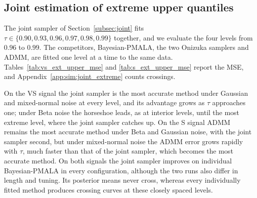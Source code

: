 \subsection{Joint estimation of extreme upper quantiles}
\label{sec:sim:extreme}

The joint sampler of Section~\ref{subsec:joint} fits $\tau\in\{0.90,0.93,0.96,0.97,0.98,0.99\}$ together, and we evaluate the four levels from $0.96$ to $0.99$. The competitors, Bayesian-PMALA, the two Onizuka samplers and ADMM, are fitted one level at a time to the same data. Tables~\ref{tab:vs_ext_upper_mse} and \ref{tab:s_ext_upper_mse} report the MSE, and Appendix~\ref{app:sim:joint_extreme} counts crossings.

On the VS signal the joint sampler is the most accurate method under Gaussian and mixed-normal noise at every level, and its advantage grows as $\tau$ approaches one; under Beta noise the horseshoe leads, as at interior levels, until the most extreme level, where the joint sampler catches up. On the S signal ADMM remains the most accurate method under Beta and Gaussian noise, with the joint sampler second, but under mixed-normal noise the ADMM error grows rapidly with $\tau$, much faster than that of the joint sampler, which becomes the most accurate method. On both signals the joint sampler improves on individual Bayesian-PMALA in every configuration, although the two runs also differ in length and tuning. Its posterior means never cross, whereas every individually fitted method produces crossing curves at these closely spaced levels.

